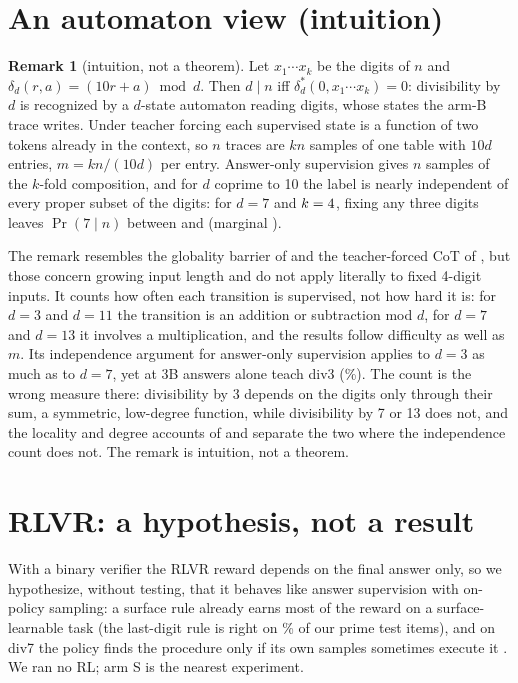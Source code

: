 \documentclass{article}
\theoremstyle{definition}
\newtheorem{remark}{Remark}
\begin{document}
\section{An automaton view (intuition)}
\label{app:automaton}
\begin{remark}[intuition, not a theorem]
\label{rem:automaton}
Let $x_1\cdots x_k$ be the digits of $n$ and $\delta_d(r,a)=(10r+a)\bmod d$. Then $d\mid n$ iff $\delta_d^{*}(0,x_1\cdots x_k)=0$: divisibility by $d$ is recognized by a $d$-state automaton reading digits, whose states the arm-B trace writes. Under teacher forcing each supervised state is a function of two tokens already in the context, so $n$ traces are $kn$ samples of one table with $10d$ entries, $m=kn/(10d)$ per entry. Answer-only supervision gives $n$ samples of the $k$-fold composition, and for $d$ coprime to 10 the label is nearly independent of every proper subset of the digits: for $d=7$ and $k=4$, fixing any three digits leaves $\Pr(7\mid n)$ between \condLow{} and \condHigh{} (marginal \condMarg).
\end{remark}
The remark resembles the globality barrier of \citet{abbe2024far} and the teacher-forced CoT of \citet{kim2025parity}, but those concern growing input length and do not apply literally to fixed 4-digit inputs. It counts how often each transition is supervised, not how hard it is: for $d=3$ and $d=11$ the transition is an addition or subtraction mod $d$, for $d=7$ and $d=13$ it involves a multiplication, and the results follow difficulty as well as $m$. Its independence argument for answer-only supervision applies to $d=3$ as much as to $d=7$, yet at 3B answers alone teach div3 (\threeBdivthreeA\%). The count is the wrong measure there: divisibility by 3 depends on the digits only through their sum, a symmetric, low-degree function, while divisibility by 7 or 13 does not, and the locality and degree accounts of \citet{abbe2024far} and \citet{prystawski2023why} separate the two where the independence count does not. The remark is intuition, not a theorem.

\section{RLVR: a hypothesis, not a result}
\label{app:rlvr}
With a binary verifier the RLVR reward depends on the final answer only, so we hypothesize, without testing, that it behaves like answer supervision with on-policy sampling: a surface rule already earns most of the reward on a surface-learnable task (the last-digit rule is right on \% of our prime test items), and on div7 the policy finds the procedure only if its own samples sometimes execute it \citep{yue2025rl}. We ran no RL; arm S is the nearest experiment.
\end{document}
